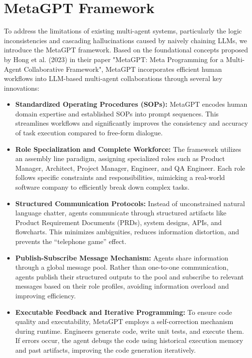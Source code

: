 \section{MetaGPT Framework}

To address the limitations of existing multi-agent systems, particularly the logic inconsistencies and cascading hallucinations caused by naively chaining LLMs, we introduce the MetaGPT framework. Based on the foundational concepts proposed by Hong et al. (2023) in their paper "MetaGPT: Meta Programming for a Multi-Agent Collaborative Framework", MetaGPT incorporates efficient human workflows into LLM-based multi-agent collaborations through several key innovations:

\begin{itemize}
    \item \textbf{Standardized Operating Procedures (SOPs):} MetaGPT encodes human domain expertise and established SOPs into prompt sequences. This streamlines workflows and significantly improves the consistency and accuracy of task execution compared to free-form dialogue.
    \item \textbf{Role Specialization and Complete Workforce:} The framework utilizes an assembly line paradigm, assigning specialized roles such as Product Manager, Architect, Project Manager, Engineer, and QA Engineer. Each role follows specific constraints and responsibilities, mimicking a real-world software company to efficiently break down complex tasks.
    \item \textbf{Structured Communication Protocols:} Instead of unconstrained natural language chatter, agents communicate through structured artifacts like Product Requirement Documents (PRDs), system designs, APIs, and flowcharts. This minimizes ambiguities, reduces information distortion, and prevents the ``telephone game'' effect.
    \item \textbf{Publish-Subscribe Message Mechanism:} Agents share information through a global message pool. Rather than one-to-one communication, agents publish their structured outputs to the pool and subscribe to relevant messages based on their role profiles, avoiding information overload and improving efficiency.
    \item \textbf{Executable Feedback and Iterative Programming:} To ensure code quality and executability, MetaGPT employs a self-correction mechanism during runtime. Engineers generate code, write unit tests, and execute them. If errors occur, the agent debugs the code using historical execution memory and past artifacts, improving the code generation iteratively.
\end{itemize}

